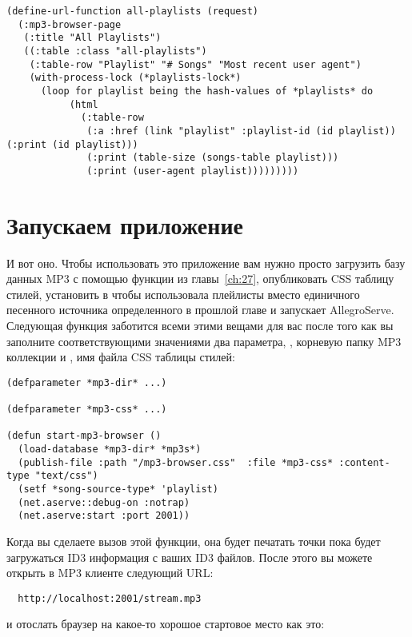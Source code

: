 \begin{lstlisting}
(define-url-function all-playlists (request)
  (:mp3-browser-page
   (:title "All Playlists")
   ((:table :class "all-playlists")
    (:table-row "Playlist" "# Songs" "Most recent user agent")
    (with-process-lock (*playlists-lock*)
      (loop for playlist being the hash-values of *playlists* do
           (html
             (:table-row
              (:a :href (link "playlist" :playlist-id (id playlist)) (:print (id playlist)))
              (:print (table-size (songs-table playlist)))
              (:print (user-agent playlist)))))))))
\end{lstlisting}

\section{Запускаем приложение}

И вот оно. Чтобы использовать это приложение вам нужно просто загрузить базу данных MP3 с
помощью функции  из главы~\ref{ch:27}, опубликовать CSS таблицу
стилей, установить  в  чтобы
 использовала плейлисты вместо единичного песенного источника
определенного в прошлой главе и запускает AllegroServe. Следующая функция заботится всеми
этими вещами для вас после того как вы заполните соответствующими значениями два
параметра, , корневую папку MP3 коллекции и , имя файла
CSS таблицы стилей:

\begin{lstlisting}
(defparameter *mp3-dir* ...)

(defparameter *mp3-css* ...)

(defun start-mp3-browser ()
  (load-database *mp3-dir* *mp3s*)
  (publish-file :path "/mp3-browser.css"  :file *mp3-css* :content-type "text/css")
  (setf *song-source-type* 'playlist)
  (net.aserve::debug-on :notrap)
  (net.aserve:start :port 2001))
\end{lstlisting}

Когда вы сделаете вызов этой функции, она будет печатать точки пока будет загружаться ID3
информация с ваших ID3 файлов. После этого вы можете открыть в MP3 клиенте следующий URL:

\begin{verbatim}
  http://localhost:2001/stream.mp3
\end{verbatim}

и отослать браузер на какое-то хорошое стартовое место как это:

